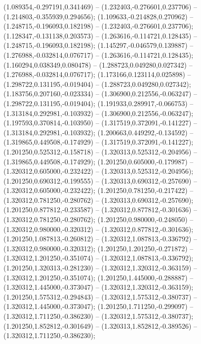  (1.089354,-0.297191,0.341469) -- (1.232403,-0.276601,0.237706) -- (1.214803,-0.355939,0.294656);
 (1.109633,-0.214828,0.270962) -- (1.248715,-0.196093,0.182198) -- (1.232403,-0.276601,0.237706);
 (1.128347,-0.131138,0.203573) -- (1.263616,-0.114721,0.128435) -- (1.248715,-0.196093,0.182198);
 (1.145297,-0.046579,0.139887) -- (1.276988,-0.032814,0.076717) -- (1.263616,-0.114721,0.128435);
 (1.160294,0.038349,0.080478) -- (1.288723,0.049280,0.027342) -- (1.276988,-0.032814,0.076717);
 (1.173166,0.123114,0.025898) -- (1.298722,0.131195,-0.019404) -- (1.288723,0.049280,0.027342);
 (1.183756,0.207160,-0.023334) -- (1.306900,0.212556,-0.063247) -- (1.298722,0.131195,-0.019404);
 (1.191933,0.289917,-0.066753) -- (1.313184,0.292981,-0.103932) -- (1.306900,0.212556,-0.063247);
 (1.197593,0.370814,-0.103950) -- (1.317519,0.372091,-0.141227) -- (1.313184,0.292981,-0.103932);
 (1.200663,0.449292,-0.134592) -- (1.319865,0.449508,-0.174929) -- (1.317519,0.372091,-0.141227);
 (1.201250,0.525312,-0.158718) -- (1.320313,0.525312,-0.204956) -- (1.319865,0.449508,-0.174929);
 (1.201250,0.605000,-0.179987) -- (1.320312,0.605000,-0.232422) -- (1.320313,0.525312,-0.204956);
 (1.201250,0.690312,-0.199555) -- (1.320313,0.690312,-0.257690) -- (1.320312,0.605000,-0.232422);
 (1.201250,0.781250,-0.217422) -- (1.320312,0.781250,-0.280762) -- (1.320313,0.690312,-0.257690);
 (1.201250,0.877812,-0.233587) -- (1.320312,0.877812,-0.301636) -- (1.320312,0.781250,-0.280762);
 (1.201250,0.980000,-0.248050) -- (1.320312,0.980000,-0.320312) -- (1.320312,0.877812,-0.301636);
 (1.201250,1.087813,-0.260812) -- (1.320312,1.087813,-0.336792) -- (1.320312,0.980000,-0.320312);
 (1.201250,1.201250,-0.271872) -- (1.320312,1.201250,-0.351074) -- (1.320312,1.087813,-0.336792);
 (1.201250,1.320313,-0.281230) -- (1.320312,1.320312,-0.363159) -- (1.320312,1.201250,-0.351074);
 (1.201250,1.445000,-0.288887) -- (1.320312,1.445000,-0.373047) -- (1.320312,1.320312,-0.363159);
 (1.201250,1.575312,-0.294843) -- (1.320312,1.575312,-0.380737) -- (1.320312,1.445000,-0.373047);
 (1.201250,1.711250,-0.299097) -- (1.320312,1.711250,-0.386230) -- (1.320312,1.575312,-0.380737);
 (1.201250,1.852812,-0.301649) -- (1.320313,1.852812,-0.389526) -- (1.320312,1.711250,-0.386230);
